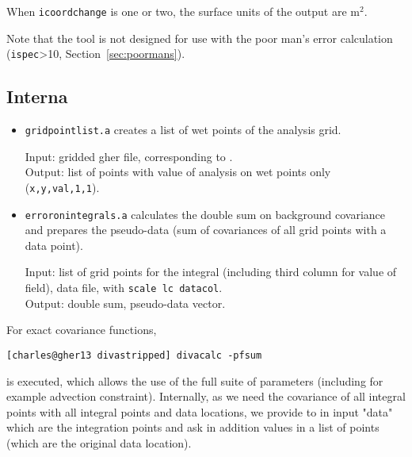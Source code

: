 When {\tt icoordchange} is one or two, the surface units of the output are m$^2$.

Note that the tool is not designed for use with the poor man's error calculation (\texttt{ispec}>10, Section~\ref{sec:poormans}).

\subsection{Interna}

\begin{itemize}

\item \texttt{gridpointlist.a} creates a list of wet points of the analysis grid. 

Input:  gridded gher file,  corresponding to .\\ 
Output:  list of points with value of analysis on wet points only (\texttt{x,y,val,1,1}).

\item \texttt{erroronintegrals.a} calculates the double sum on background covariance and prepares the pseudo-data (sum of covariances of all grid points with a  data point).

Input:  list of grid points for the integral (including third column for value of field),  data file,  with \texttt{scale lc datacol}.\\
Output:  double sum,  pseudo-data vector.
\end{itemize}

For exact covariance functions, 

\begin{lstlisting}[style=Bash]
[charles@gher13 divastripped] divacalc -pfsum
\end{lstlisting}

is executed, which allows the use of the full suite of \diva parameters (including for example advection constraint). Internally, as we need the covariance of all integral points with all integral points and data locations, we provide to  in input "data" which are the integration points and ask in addition values in a list of points (which are the original data location).

